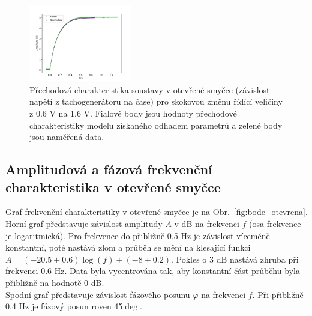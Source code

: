 		\begin{figure}
			\centering
			\includegraphics[width = 0.4\textwidth]{img/graf_prechodova.pdf} 
			\caption{Přechodová charakteristika soustavy v otevřené smyčce (závislost napětí z tachogenerátoru na čase) 
			pro skokovou změnu řídící veličiny z 0.6 V na 1.6 V. 
			Fialové body jsou hodnoty přechodové charakteristiky modelu získaného odhadem parametrů a zelené body jsou naměřená data.} 
			\label{fig:prechodova} 
		\end{figure}

	\subsection{Amplitudová a fázová frekvenční charakteristika v otevřené smyčce}
		Graf frekvenční charakteristiky v otevřené smyčce je na Obr.~\ref{fig:bode_otevrena}. Horní graf představuje závislost amplitudy $A$ v dB na frekvenci $f$ (osa frekvence je logaritmická). Pro frekvence do přibližně 0.5 Hz je závislost víceméně konstantní, poté nastává zlom a průběh se mění na klesající funkci $A=(-20.5\pm 0.6)\log(f)+(-8\pm 0.2)$. Pokles o 3 dB nastává zhruba při frekvenci 0.6 Hz. Data byla vycentrována tak, aby konstantní část průběhu byla přibližně na hodnotě 0 dB. \\
		Spodní graf představuje závislost fázového posunu $\varphi$ na frekvenci $f$. Při přibližně 0.4 Hz je fázový posun roven 45$\deg$.

